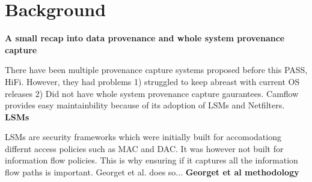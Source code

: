 \section{Background}

\textbf{A small recap into data provenance and whole system provenance capture}

There have been multiple provenance capture systems proposed before this PASS, HiFi. However, they had problems 1) struggled to keep abreast with current OS releases 2) Did not have whole system provenance capture gaurantees. Camflow provides easy maintainbility because of its adoption of LSMs and Netfilters.
\vskip 0.1in
\textbf{LSMs}

LSMs are security frameworks which were initially built for accomodationg differnt access policies such as MAC and DAC. It was however not built for information flow policies. This is why ensuring if it captures all the information flow paths is important. Georget et al. does so...
\vskip 0.1in
\textbf{Georget et al methodology}

